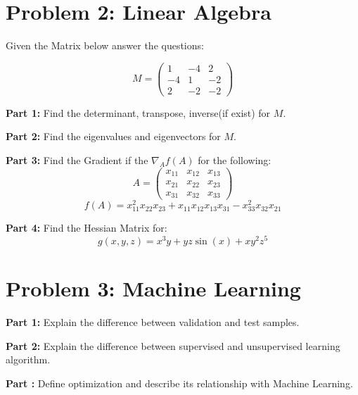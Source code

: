 \documentclass[12pt,letterpaper]{article}
\begin{document}
\section*{Problem 2: Linear Algebra}

Given the Matrix below answer the questions:

\begin{equation*}
   M = \begin{pmatrix}
1 & -4 & 2 \\
-4 & 1 & -2 \\
2 & -2 & -2
\end{pmatrix}
\end{equation*}


    \item \textbf{Part 1:} Find the determinant, transpose, inverse(if exist) for $M$.

    \item \textbf{Part 2:} Find the eigenvalues and eigenvectors for $M$.

    \item \textbf{Part 3:} Find the Gradient if the $\nabla_A f(A)$ for the following:
   \begin{equation*}
	A=\begin{pmatrix}
	x_{11} & x_{12} & x_{13} \\
	x_{21} & x_{22} & x_{23} \\
	x_{31} & x_{32} & x_{33}
	\end{pmatrix}
  \end{equation*}
  \begin{equation*}
   f(A)= x_{11}^2 x_{22} x_{23} + x_{11}x_{12}x_{13}x_{31}-x_{33}^2 x_{32} x_{21}
   \end{equation*}

	\item \textbf{Part 4:} Find the Hessian Matrix for:
   \begin{equation*}
	g(x,y,z)=x^3y+yz\sin(x)+xy^2z^5
  \end{equation*}

\section*{Problem 3: Machine Learning}
 \item \textbf{Part 1:} Explain the difference between validation and test samples.

 \item \textbf{Part 2:} Explain the difference between supervised and unsupervised learning algorithm.

 \item \textbf{Part :} Define optimization and describe its relationship with Machine Learning.
\end{document}
